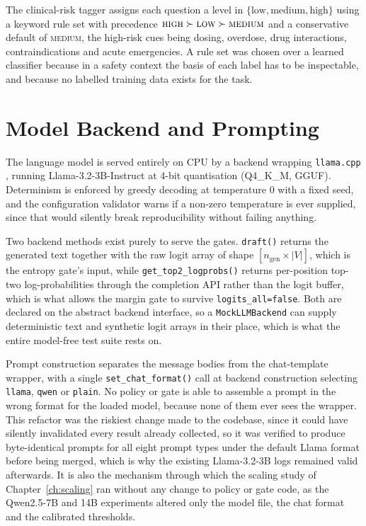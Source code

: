 The clinical-risk tagger assigns each question a level in
$\{\text{low}, \text{medium}, \text{high}\}$ using a keyword rule set with
precedence $\textsc{high} \succ \textsc{low} \succ \textsc{medium}$ and a
conservative default of \textsc{medium}, the high-risk cues being dosing,
overdose, drug interactions, contraindications and acute emergencies. A rule
set was chosen over a learned classifier because in a safety context the basis
of each label has to be inspectable, and because no labelled training data
exists for the task.

\section{Model Backend and Prompting}
\label{sec:impl-backend}

The language model is served entirely on CPU by a backend wrapping
\texttt{llama.cpp} \citep{llamacpp}, running Llama-3.2-3B-Instruct
\citep{llama3} at 4-bit quantisation (Q4\_K\_M, GGUF). Determinism is enforced
by greedy decoding at temperature 0 with a fixed seed, and the configuration
validator warns if a non-zero temperature is ever supplied, since that would
silently break reproducibility without failing anything.

Two backend methods exist purely to serve the gates. \texttt{draft()} returns
the generated text together with the raw logit array of shape
$[n_{\text{gen}} \times |V|]$, which is the entropy gate's input, while
\texttt{get\_top2\_logprobs()} returns per-position top-two log-probabilities
through the completion API rather than the logit buffer, which is what allows
the margin gate to survive \texttt{logits\_all=false}. Both are declared on
the abstract backend interface, so a \texttt{MockLLMBackend} can supply
deterministic text and synthetic logit arrays in their place, which is what
the entire model-free test suite rests on.

Prompt construction separates the message bodies from the chat-template
wrapper, with a single \texttt{set\_chat\_format()} call at backend
construction selecting \texttt{llama}, \texttt{qwen} or \texttt{plain}. No
policy or gate is able to assemble a prompt in the wrong format for the loaded
model, because none of them ever sees the wrapper. This refactor was the
riskiest change made to the codebase, since it could have silently invalidated
every result already collected, so it was verified to produce byte-identical
prompts for all eight prompt types under the default Llama format before being
merged, which is why the existing Llama-3.2-3B logs remained valid afterwards.
It is also the mechanism through which the scaling study of
Chapter~\ref{ch:scaling} ran without any change to policy or gate code, as the
Qwen2.5-7B and 14B experiments altered only the model file, the chat format
and the calibrated thresholds.

